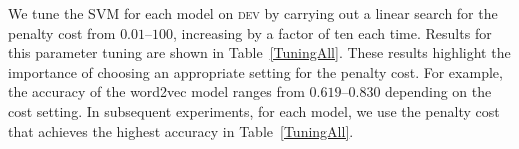 \documentclass[11pt,a4paper]{article}
\newcommand{\secref}[1]{Section~\ref{#1}}
\newcommand{\tabref}[1]{Table~\ref{#1}}
\newcommand{\dev}{\textsc{dev}\xspace}
\begin{document}
We tune the SVM for each model on \dev by carrying out a linear search
for the penalty cost from $0.01$--$100$, increasing by a factor of ten
each time. Results for this parameter tuning are shown in
\tabref{TuningAll}. These results highlight the importance of choosing
an appropriate setting for the penalty cost. For example, the accuracy
of the word2vec model ranges from $0.619$--$0.830$ depending on the
cost setting. In subsequent experiments, for each model, we use the
penalty cost that achieves the highest accuracy in \tabref{TuningAll}.

%
%
\end{document}
